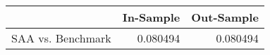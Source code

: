 \begin{tabular}{lrr}
\toprule
{} &  In-Sample &  Out-Sample \\
\midrule
SAA vs. Benchmark &   0.080494 &    0.080494 \\
\bottomrule
\end{tabular}

